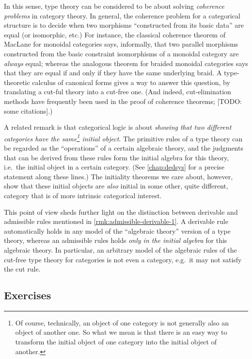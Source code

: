 \documentclass{book}
\begin{document}
In this sense, type theory can be considered to be about solving \emph{coherence problems} in category theory.
In general, the coherence problem for a categorical structure is to decide when two morphisms ``constructed from its basic data'' are equal (or isomorphic, etc.)
For instance, the classical coherence theorem of MacLane for monoidal categories says, informally, that two parallel morphisms constructed from the basic constraint isomorphisms of a monoidal category are \emph{always} equal; whereas the analogous theorem for braided monoidal categories says that they are equal if and only if they have the same underlying braid.
A type-theoretic calculus of canonical forms gives a way to answer this question, by translating a cut-ful theory into a cut-free one.
(And indeed, cut-elimination methods have frequently been used in the proof of coherence theorems; [TODO: some citations].)

\label{sec:identifying-initial-objects}
A related remark is that categorical logic is about \emph{showing that two different categories have the same\footnote{Of course, technically, an object of one category is not generally also an object of another one.  So what we mean is that there is an easy way to transform the initial object of one category into the initial object of another.} initial object}.
The primitive rules of a type theory can be regarded as the ``operations'' of a certain algebraic theory, and the judgments that can be derived from these rules form the initial algebra for this theory, i.e.\ the initial object in a certain category.
(See \cref{chap:dedsys} for a precise statement along these lines.)
The initiality theorems we care about, however, show that these initial objects are \emph{also} initial in some other, quite different, category that is of more intrinsic categorical interest.

\begin{rmk}\label{rmk:admissible-derivable-2}
  This point of view sheds further light on the distinction between derivable and admissible rules mentioned in \cref{rmk:admissible-derivable-1}.
  A derivable rule automatically holds in any model of the ``algebraic theory'' version of a type theory, whereas an admissible rules holds \emph{only in the initial algebra} for this algebraic theory.
  In particular, an arbitrary model of the algebraic rules of the cut-free type theory for categories is not even a category, e.g.\ it may not satisfy the cut rule.
\end{rmk}


\subsection*{Exercises}
\end{document}
